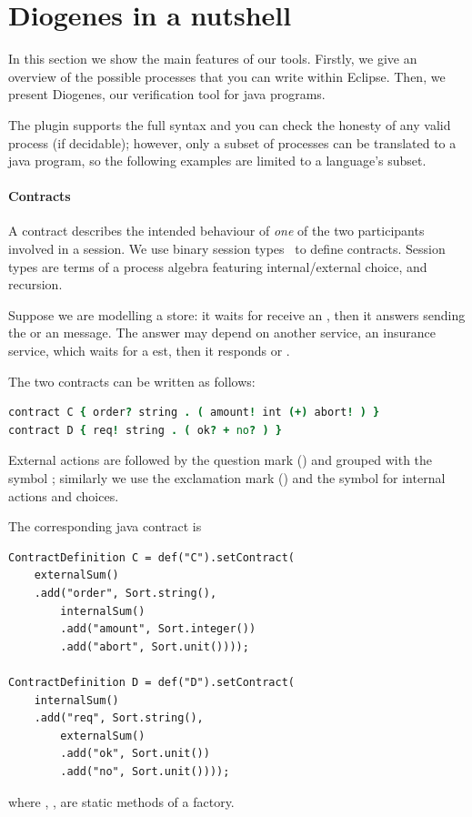 \section{Diogenes in a nutshell}

In this section we show the main features of our tools.
%
Firstly, we give an overview of the possible \coco processes
that you can write within Eclipse. 
Then, we present Diogenes, our verification tool for java programs.

The plugin supports the full \coco syntax and you can check
the honesty of any valid process (if decidable); however,
only a subset of processes can be translated to a java program, 
so the following examples are limited to a language's subset.

\paragraph{Contracts}
A contract describes the intended behaviour of \emph{one} of the two
participants involved in a session.  We use binary session
types~\cite{Honda98esop} to define contracts.  Session types are terms
of a process algebra featuring internal/external choice, and
recursion.

Suppose we are modelling a store: it waits for receive
an , then it answers sending the  or an  message.
The answer may depend on another service, \ie an insurance service,
which waits for a est, then it responds  or .

The two contracts can be written as follows:
%
\begin{lstlisting}[language=coco,basicstyle=\scriptsize\ttfamily]
contract C { order? string . ( amount! int (+) abort! ) }
contract D { req! string . ( ok? + no? ) }
\end{lstlisting}
External actions are followed by the question mark () and grouped
with the symbol \code{+}; similarly we use the
exclamation mark (\code{!}) and the symbol \code{(+)} for
internal actions and choices.

The corresponding java contract is
\begin{mdframed}
\begin{verbatim}
ContractDefinition C = def("C").setContract(
    externalSum()
    .add("order", Sort.string(), 
        internalSum()
        .add("amount", Sort.integer())
        .add("abort", Sort.unit())));
        
ContractDefinition D = def("D").setContract(
    internalSum()
    .add("req", Sort.string(), 
        externalSum()
        .add("ok", Sort.unit())
        .add("no", Sort.unit())));
\end{verbatim}
\end{mdframed}
where , ,  
are static methods of a factory.

